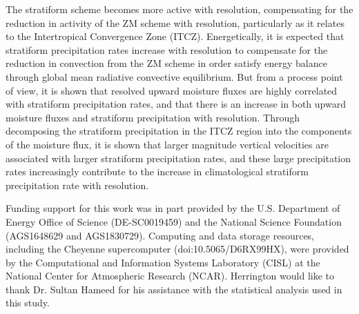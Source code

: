 \documentclass[times]{qjrms4}
\begin{document}
The stratiform scheme becomes more active with resolution, compensating for the reduction in activity of the ZM scheme with resolution, particularly as it relates to the Intertropical Convergence Zone (ITCZ). Energetically, it is expected that stratiform precipitation rates increase with resolution to compensate for the reduction in convection from the ZM scheme in order satisfy energy balance through global mean radiative convective equilibrium. But from a process point of view, it is shown that resolved upward moisture fluxes are highly correlated with stratiform precipitation rates, and that there is an increase in both upward moisture fluxes and stratiform precipitation with resolution. Through decomposing the stratiform precipitation in the ITCZ region into the components of the moisture flux, it is shown that larger magnitude vertical velocities are associated with larger stratiform precipitation rates, and these large precipitation rates increasingly contribute to the increase in climatological stratiform precipitation rate with resolution.

{\color{red}{Wrap up with a closing paragraph}}

\ack 
Funding support for this work was in part provided by the U.S. Department of Energy Office of Science (DE-SC0019459) and the National Science Foundation (AGS1648629 and AGS1830729). Computing and data storage resources, including the Cheyenne supercomputer (doi:10.5065/D6RX99HX), were provided by the Computational and Information Systems Laboratory (CISL) at the National Center for Atmospheric Research (NCAR). Herrington would like to thank Dr. Sultan Hameed for his assistance with the statistical analysis used in this study.



\end{document}
